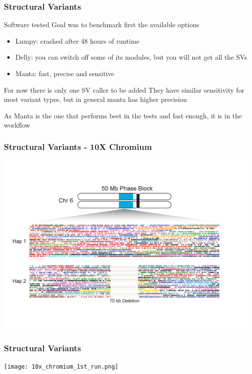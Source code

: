 \documentclass{beamer}
\begin{document}
\begin{frame}
\frametitle{Structural Variants}
	\begin{block}{Software tested}
	Goal was to benchmark first the available options
	\end{block}
	\begin{itemize}		
		\item Lumpy: crashed after 48 hours of runtime 
		\item Delly: you can switch off some of its modules, but you will not get all the SVs
		\item Manta: fast, precise and sensitive
	\end{itemize}
	\begin{block}{For now there is only one SV caller to be added}
	They have similar sensitivity for most variant types, but in general manta has higher precision

	As Manta is the one that performs best in the tests and fast enough, it is in the workflow
	\end{block}
\end{frame}

\begin{frame}
\frametitle{Structural Variants - 10X Chromium}
\includegraphics[width=1.0\linewidth]{multi-megabase-phase-blocks-large.jpg}
\end{frame}

\begin{frame}
\frametitle{Structural Variants}
\texttt{[image: 10x\_chromium\_1st\_run.png]}
\end{frame}
\end{document}
